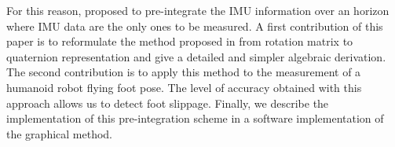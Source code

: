 For this reason, \cite{LUPTON-09,forster2015imu} proposed to pre-integrate the IMU information over an horizon where IMU data are the only
ones to be measured.
A first contribution of this paper is to reformulate the method proposed in \cite{forster2015imu} from rotation matrix to quaternion representation
and give a detailed and simpler algebraic derivation.
The second contribution is to apply this method to the measurement of a humanoid robot flying foot pose.
The level of accuracy obtained with this approach allows us to detect foot slippage. 
Finally, we describe the implementation of this pre-integration scheme in a software implementation of the graphical method.





